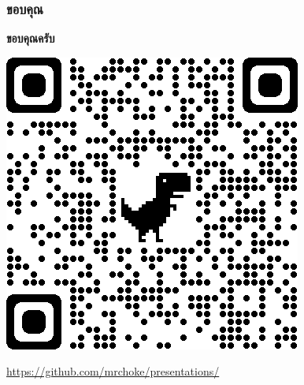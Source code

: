 \begin{frame}
  \frametitle{ขอบคุณ}

  \begin{center}
    {\bfseries \LARGE ขอบคุณครับ}

    \includegraphics[width=.25\linewidth]{images/qrcode-url.png}


    {\url{https://github.com/mrchoke/presentations/}}
  \end{center}

\end{frame}